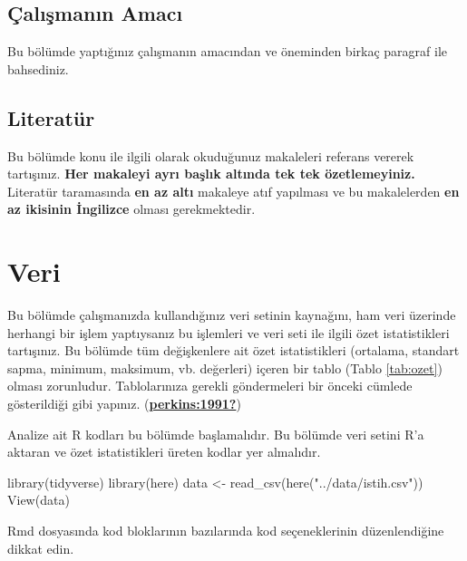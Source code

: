 \documentclass[
  12pt,
]{article}
\newenvironment{Shaded}{\begin{snugshade}}{\end{snugshade}}
\newcommand{\FunctionTok}[1]{\textcolor[rgb]{0.00,0.00,0.00}{#1}}
\newcommand{\NormalTok}[1]{#1}
\newcommand{\OtherTok}[1]{\textcolor[rgb]{0.56,0.35,0.01}{#1}}
\newcommand{\StringTok}[1]{\textcolor[rgb]{0.31,0.60,0.02}{#1}}
\begin{document}
\hypertarget{uxe7alux131ux15fmanux131n-amacux131}{%
\subsection{Çalışmanın Amacı}\label{uxe7alux131ux15fmanux131n-amacux131}}

Bu bölümde yaptığınız çalışmanın amacından ve öneminden birkaç paragraf ile bahsediniz.

\hypertarget{literatuxfcr}{%
\subsection{Literatür}\label{literatuxfcr}}

Bu bölümde konu ile ilgili olarak okuduğunuz makaleleri referans vererek tartışınız. \textbf{Her makaleyi ayrı başlık altında tek tek özetlemeyiniz.} Literatür taramasında \textbf{en az altı} makaleye atıf yapılması ve bu makalelerden \textbf{en az ikisinin İngilizce} olması gerekmektedir.

\hypertarget{veri}{%
\section{Veri}\label{veri}}

Bu bölümde çalışmanızda kullandığınız veri setinin kaynağını, ham veri üzerinde herhangi bir işlem yaptıysanız bu işlemleri ve veri seti ile ilgili özet istatistikleri tartışınız. Bu bölümde tüm değişkenlere ait özet istatistikleri (ortalama, standart sapma, minimum, maksimum, vb. değerleri) içeren bir tablo (Tablo \ref{tab:ozet}) olması zorunludur. Tablolarınıza gerekli göndermeleri bir önceki cümlede gösterildiği gibi yapınız. (\protect\hyperlink{ref-perkins:1991}{\textbf{perkins:1991?}})

Analize ait R kodları bu bölümde başlamalıdır. Bu bölümde veri setini R'a aktaran ve özet istatistikleri üreten kodlar yer almalıdır.

\begin{Shaded}
\begin{Highlighting}[]
\FunctionTok{library}\NormalTok{(tidyverse)}
\FunctionTok{library}\NormalTok{(here)}
\NormalTok{data }\OtherTok{\textless{}{-}} \FunctionTok{read\_csv}\NormalTok{(}\FunctionTok{here}\NormalTok{(}\StringTok{"../data/istih.csv"}\NormalTok{))}
\FunctionTok{View}\NormalTok{(data)}
\end{Highlighting}
\end{Shaded}

Rmd dosyasında kod bloklarının bazılarında kod seçeneklerinin düzenlendiğine dikkat edin.
\end{document}
